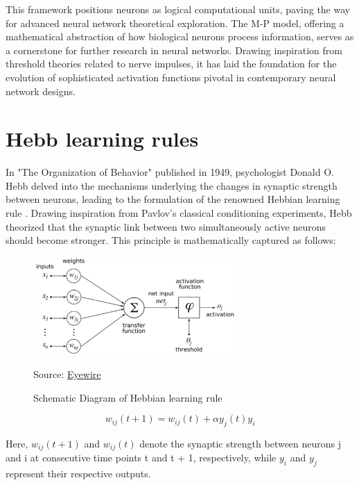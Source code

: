 \documentclass[12pt,a4paper]{report}
\begin{document}
This framework positions neurons as logical computational units, paving the way for advanced neural network theoretical exploration. The M-P model, offering a mathematical abstraction of how biological neurons process information, serves as a cornerstone for further research in neural networks. Drawing inspiration from threshold theories related to nerve impulses, it has laid the foundation for the evolution of sophisticated activation functions pivotal in contemporary neural network designs.


\section{Hebb learning rules}
In "The Organization of Behavior" published in 1949, psychologist Donald O. Hebb delved into the mechanisms underlying the changes in synaptic strength between neurons, leading to the formulation of the renowned Hebbian learning rule \cite{Hebb2002OrganizationBehaviorNeuropsychological}. Drawing inspiration from Pavlov's classical conditioning experiments, Hebb theorized that the synaptic link between two simultaneously active neurons should become stronger. This principle is mathematically captured as follows:

\begin{figure}[H]
    \centering
    \includegraphics[width=0.7\textwidth]{./data/Diagram of Hebbian learning rule.jpg}
    \caption{Schematic Diagram of Hebbian learning rule}
    \label{fig:my_picture}
    \vspace{1pt} %
    \small{Source: \href{https://wiki.eyewire.org/Contrastive_Hebbian_learning}{Eyewire}}
\end{figure}

\begin{equation}
    w_{ij}(t + 1) = w_{ij}(t) + \alpha y_j(t)y_i
\end{equation}

Here, $w_{ij}(t+1)$ and $w_{ij}(t)$ denote the synaptic strength between neurons j and i at consecutive time points t and t + 1, respectively, while $y_i$ and $y_j$ represent their respective outputs.
\end{document}
